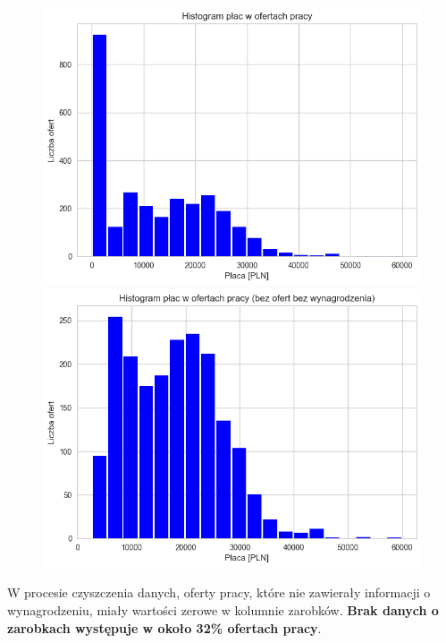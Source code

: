 \documentclass{article}
\begin{document}
\begin{figure}[h]
    \centering
    \begin{minipage}{0.45\textwidth}
        \centering
        \includegraphics[width=\textwidth]{img/hist_zarobki_z_zerami.png}
    \end{minipage}
    \hfill
    \begin{minipage}{0.45\textwidth}
        \centering
        \includegraphics[width=\textwidth]{img/hist_zarobki_bez_zer.png}
    \end{minipage}
\end{figure}

W procesie czyszczenia danych, oferty pracy, które nie zawierały informacji o wynagrodzeniu, miały wartości zerowe w kolumnie zarobków.
\textbf{Brak danych o zarobkach występuje w około 32\% ofertach pracy}.
\medskip
\end{document}
